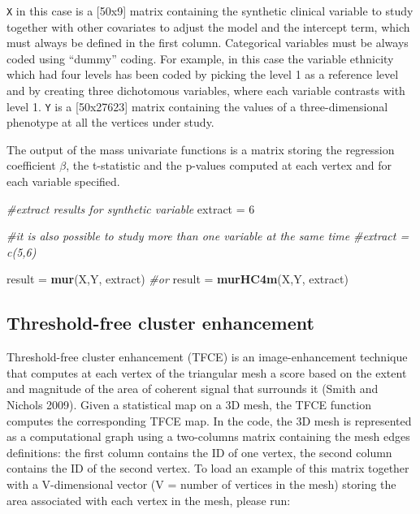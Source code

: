 \documentclass[]{article}
\newenvironment{Shaded}{\begin{snugshade}}{\end{snugshade}}
\newcommand{\KeywordTok}[1]{\textcolor[rgb]{0.13,0.29,0.53}{\textbf{{#1}}}}
\newcommand{\DecValTok}[1]{\textcolor[rgb]{0.00,0.00,0.81}{{#1}}}
\newcommand{\StringTok}[1]{\textcolor[rgb]{0.31,0.60,0.02}{{#1}}}
\newcommand{\CommentTok}[1]{\textcolor[rgb]{0.56,0.35,0.01}{\textit{{#1}}}}
\newcommand{\NormalTok}[1]{{#1}}
\begin{document}
\texttt{X} in this case is a {[}50x9{]} matrix containing the synthetic
clinical variable to study together with other covariates to adjust the
model and the intercept term, which must always be defined in the first
column. Categorical variables must be always coded using ``dummy''
coding. For example, in this case the variable ethnicity which had four
levels has been coded by picking the level 1 as a reference level and by
creating three dichotomous variables, where each variable contrasts with
level 1. \texttt{Y} is a {[}50x27623{]} matrix containing the values of
a three-dimensional phenotype at all the vertices under study.

The output of the mass univariate functions is a matrix storing the
regression coefficient \(\beta\), the t-statistic and the p-values
computed at each vertex and for each variable specified.

\begin{Shaded}
\begin{Highlighting}[]
\CommentTok{#extract results for synthetic variable}
\NormalTok{extract =}\StringTok{ }\DecValTok{6}

\CommentTok{#it is also possible to study more than one variable at the same time}
\CommentTok{#extract = c(5,6)}

\NormalTok{result =}\StringTok{ }\KeywordTok{mur}\NormalTok{(X,Y, extract)}
\CommentTok{#or}
\NormalTok{result =}\StringTok{ }\KeywordTok{murHC4m}\NormalTok{(X,Y, extract)}
\end{Highlighting}
\end{Shaded}

\subsection{Threshold-free cluster
enhancement}\label{threshold-free-cluster-enhancement}

Threshold-free cluster enhancement (TFCE) is an image-enhancement
technique that computes at each vertex of the triangular mesh a score
based on the extent and magnitude of the area of coherent signal that
surrounds it (Smith and Nichols 2009). Given a statistical map on a 3D
mesh, the TFCE function computes the corresponding TFCE map. In the
code, the 3D mesh is represented as a computational graph using a
two-columns matrix containing the mesh edges definitions: the first
column contains the ID of one vertex, the second column contains the ID
of the second vertex. To load an example of this matrix together with a
V-dimensional vector (V = number of vertices in the mesh) storing the
area associated with each vertex in the mesh, please run:
\end{document}
